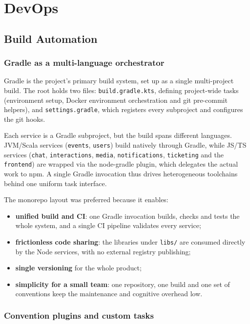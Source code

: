 \section{DevOps}
\label{sec:devops}

\subsection{Build Automation}

\subsubsection{Gradle as a multi-language orchestrator}

Gradle is the project's primary build system, set up as a single multi-project build. The root holds two files: \texttt{build.gradle.kts}, defining project-wide tasks (environment setup, Docker environment orchestration and git pre-commit helpers), and \texttt{settings.gradle}, which registers every subproject and configures the git hooks.

Each service is a Gradle subproject, but the build spans different languages. JVM/Scala services (\texttt{events}, \texttt{users}) build natively through Gradle, while JS/TS services (\texttt{chat}, \texttt{interactions}, \texttt{media}, \texttt{notifications}, \texttt{ticketing} and the \texttt{frontend}) are wrapped via the node-gradle plugin, which delegates the actual work to npm. A single Gradle invocation thus drives heterogeneous toolchains behind one uniform task interface.

The monorepo layout was preferred because it enables:
\begin{itemize}
  \item \textbf{unified build and CI}: one Gradle invocation builds, checks and tests the whole system, and a single CI pipeline validates every service;
  \item \textbf{frictionless code sharing}: the libraries under \texttt{libs/} are consumed directly by the Node services, with no external registry publishing;
  \item \textbf{single versioning} for the whole product;
  \item \textbf{simplicity for a small team}: one repository, one build and one set of conventions keep the maintenance and cognitive overhead low.
\end{itemize}

\subsubsection{Convention plugins and custom tasks}

